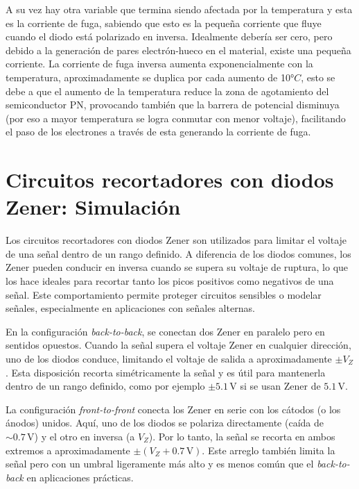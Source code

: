 \documentclass[chaptersright]{informeutn}
\begin{document}
      A su vez hay otra variable que termina siendo afectada por la temperatura y esta es la corriente de fuga,
      sabiendo que esto es la pequeña corriente que fluye cuando el diodo está polarizado en inversa. Idealmente
      debería ser cero, pero debido a la generación de pares electrón-hueco en el material, existe una pequeña
      corriente. La corriente de fuga inversa aumenta exponencialmente con la temperatura, aproximadamente se
      duplica por cada aumento de 10$°C$, esto se debe a que el aumento de la temperatura reduce la zona de
      agotamiento del semiconductor PN, provocando también que la barrera de potencial disminuya (por eso a mayor
      temperatura se logra conmutar con menor voltaje), facilitando el paso de los electrones a través de esta
      generando la corriente de fuga.

    \chapter{Circuitos recortadores con diodos Zener: Simulación}
      Los circuitos recortadores con diodos Zener son utilizados para limitar el voltaje de una señal dentro de un
      rango definido. A diferencia de los diodos comunes, los Zener pueden conducir en inversa cuando se supera su
      voltaje de ruptura, lo que los hace ideales para recortar tanto los picos positivos como negativos de una señal.
      Este comportamiento permite proteger circuitos sensibles o modelar señales, especialmente en aplicaciones con
      señales alternas.

      En la configuración \textit{back-to-back}, se conectan dos Zener en paralelo pero en sentidos opuestos. Cuando la
      señal supera el voltaje Zener en cualquier dirección, uno de los diodos conduce, limitando el voltaje de salida
      a aproximadamente $\pm V_Z$. Esta disposición recorta simétricamente la señal y es útil para mantenerla dentro de
      un rango definido, como por ejemplo $\pm 5.1\,\text{V}$ si se usan Zener de $5.1\,\text{V}$.

      La configuración \textit{front-to-front} conecta los Zener en serie con los cátodos (o los ánodos) unidos. Aquí,
      uno de los diodos se polariza directamente (caída de $\sim 0.7\,\text{V}$) y el otro en inversa (a $V_Z$). Por lo
      tanto, la señal se recorta en ambos extremos a aproximadamente $\pm (V_Z + 0.7\,\text{V})$. Este arreglo también
      limita la señal pero con un umbral ligeramente más alto y es menos común que el \textit{back-to-back} en
      aplicaciones prácticas.
\end{document}
